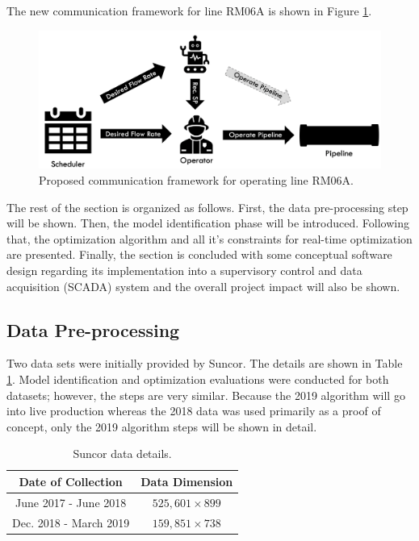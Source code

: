 The new communication framework for line RM06A is shown in Figure \ref{fig:08scheduleV2}.

\begin{figure}[h]
    \centering
    \includegraphics[scale=0.35]{images/08ScheduleV2.png}
    \caption{Proposed communication framework for operating line RM06A.}
    \label{fig:08scheduleV2}
\end{figure}

The rest of the section is organized as follows.  First, the data pre-processing step will be shown.  Then, the model identification phase will be introduced.  Following that, the optimization algorithm and all it's constraints for real-time optimization are presented.  Finally, the section is concluded with some conceptual software design regarding its implementation into a supervisory control and data acquisition (SCADA) system and the overall project impact will also be shown.

\subsection{Data Pre-processing}
Two data sets were initially provided by Suncor.  The details are shown in Table \ref{tab:08data}. Model identification and optimization evaluations were conducted for both datasets; however, the steps are very similar.  Because the 2019 algorithm will go into live production whereas the 2018 data was used primarily as a proof of concept, only the 2019 algorithm steps will be shown in detail.

\begin{table}[h]
    \centering
    {
    \begin{tabular}{ c | c }
        Date of Collection     &      Data Dimension      \\
        \hline
        June 2017 - June 2018  &    $525,601 \times 899$   \\
        Dec. 2018 - March 2019 &    $159,851 \times 738$   \\
    \end{tabular}}
    \caption{Suncor data details.}
    \label{tab:08data}
\end{table}

